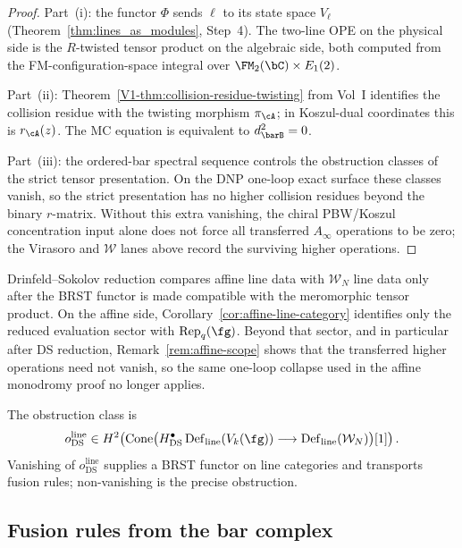 \begin{proof}
Part~(i): the functor $\Phi$ sends $\ell$ to its state space $V_\ell$
\textup{(}Theorem~\textup{\ref{thm:lines_as_modules}}, Step~4\textup{)}.
The two-line OPE on the physical side is the $R$-twisted tensor product
on the algebraic side, both computed from the FM-configuration-space
integral over $\FM_2(\bC)\times E_1(2)$.

Part~(ii): Theorem~\textup{\ref{V1-thm:collision-residue-twisting}} from
Vol~I identifies the collision residue with the twisting morphism
$\pi_\cA$; in Koszul-dual coordinates this is $r_\cA(z)$. The
MC equation is equivalent to $d^2_{\barB}=0$.

Part~(iii): the ordered-bar spectral sequence controls the obstruction
classes of the strict tensor presentation. On the DNP one-loop exact
surface these classes vanish, so the strict presentation has no
higher collision residues beyond the binary $r$-matrix. Without this
extra vanishing, the chiral PBW/Koszul concentration input alone does not
force all transferred $A_\infty$ operations to be zero; the Virasoro
and $\mathcal W$ lanes above record the surviving higher operations.
\end{proof}

\begin{remark}
\label{comp:ds-on-line-categories}
Drinfeld--Sokolov reduction compares affine line data with
$\mathcal W_N$ line data only after the BRST functor is made
compatible with the meromorphic tensor product. On the
affine side, Corollary~\ref{cor:affine-line-category} identifies
only the reduced evaluation sector with
$\operatorname{Rep}_q(\fg)$. Beyond that sector, and in
particular after DS reduction, Remark~\ref{rem:affine-scope}
shows that the transferred higher operations need not vanish, so
the same one-loop collapse used in the affine monodromy proof no
longer applies.

The obstruction class is
\[
 o_{\mathrm{DS}}^{\mathrm{line}}\in
 H^2\!\left(
 \operatorname{Cone}\bigl(
 H^\bullet_{\mathrm{DS}}\operatorname{Def}_{\mathrm{line}}(V_k(\fg))
 \longrightarrow
 \operatorname{Def}_{\mathrm{line}}(\mathcal W_N)
 \bigr)[1]\right).
\]
Vanishing of $o_{\mathrm{DS}}^{\mathrm{line}}$ supplies a BRST functor
on line categories and transports fusion rules; non-vanishing is the
precise obstruction.
\end{remark}

\subsection{Fusion rules from the bar complex}
\label{subsec:fusion-rules}

